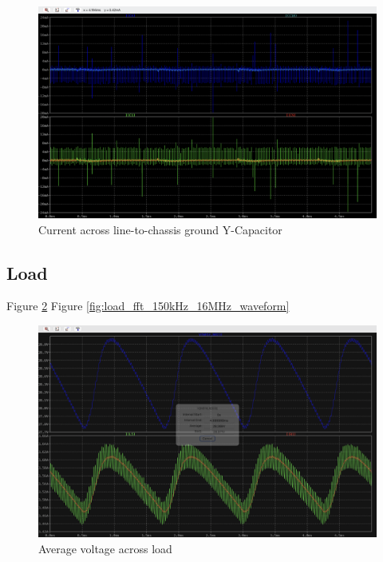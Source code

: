 \documentclass[conference]{IEEEtran}
\begin{document}
\begin{figure}[htp]
    \centering
    \includegraphics[width=1.0\linewidth]{output_filter_chassis_ground_y_capacitors.png}
    \caption{Current across line-to-chassis ground Y-Capacitor}
    \label{fig:output_filter_chassis_ground_y_capacitors_waveforms}
\end{figure}

\subsection{Load}

Figure \ref{fig:load_average_voltage_waveform}
Figure \ref{fig:load_fft_150kHz_16MHz_waveform}

\begin{figure}[htp]
    \centering
    \includegraphics[width=1.0\linewidth]{load_average_voltage.png}
    \caption{Average voltage across load}
    \label{fig:load_average_voltage_waveform}
\end{figure}
\end{document}
